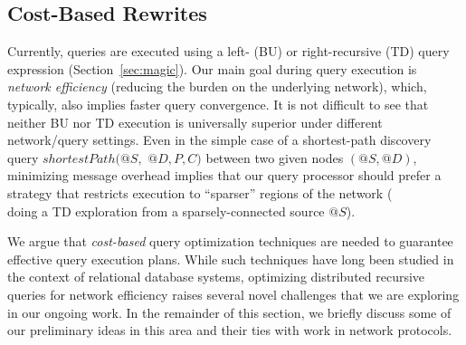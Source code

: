 \subsection{Cost-Based Rewrites}
\label{subsec:hybridRewrites}

Currently, queries are executed using a left- (BU) or
right-recursive (TD) query expression (Section~\ref{sec:magic}).
Our main goal during query execution is {\em network efficiency\/} 
(\ie reducing the burden on the underlying network), which, typically,
also implies faster query convergence. 
It is not difficult to see that neither BU nor TD execution is universally 
superior under different network/query settings.
Even in the simple case of a shortest-path discovery query 
$shortestPath(@S,$ $@D,P,C)$ between two given nodes $(@S,@D)$,
minimizing message overhead implies that our query processor
should prefer a strategy that restricts execution to ``sparser'' regions
of the network (\eg \\doing a TD exploration from a sparsely-connected 
source $@S$).
%

We argue that {\em cost-based\/} query optimization techniques are needed 
to guarantee effective query execution plans.
While such techniques have long been studied in the context of relational 
database systems, optimizing distributed recursive queries for network
efficiency raises several novel challenges 
that we are exploring in our ongoing work.
In the remainder of this section, we briefly discuss some of our 
preliminary ideas in this area and their ties with work in 
network protocols.
%

